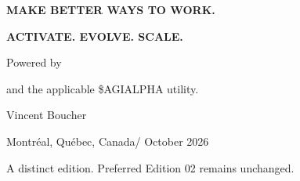 \begin{titlepage}
\begin{tikzpicture}
\end{tikzpicture}
\vfill
{\sffamily\large\bfseries MAKE BETTER WAYS TO WORK.\par}
\vspace{.55cm}
{\sffamily\large\OmegaHarness\par}
{\sffamily\bfseries\color{gold}ACTIVATE. EVOLVE. SCALE.\par}
\vspace{.35cm}
{\sffamily\small Powered by \TI\par and the applicable \$AGIALPHA utility.\par}
\vspace{.6cm}
{\large Vincent Boucher\par}
{\sffamily\small Montr\'eal, Qu\'ebec, Canada\quad / October 2026\par}
\vspace{.3cm}
{\sffamily\scriptsize A distinct edition. Preferred Edition 02 remains unchanged.\par}
\end{titlepage}

\clearpage









\clearpage



